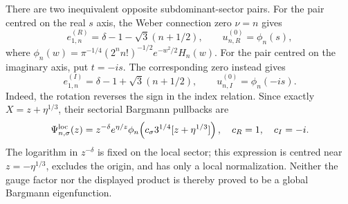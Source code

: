 \documentclass[11pt]{article}
\theoremstyle{remark}
\begin{document}
There are two inequivalent opposite subdominant-sector pairs.  For the pair
centred on the real \(s\) axis, the Weber connection zero \(\nu=n\) gives
\begin{equation}
 e_{1,n}^{(R)}=\delta-1-\sqrt3(n+1/2),\qquad
 u_{n,R}^{(0)}=\phi_n(s),
 \label{eq:fedoryuk-real-branch}
\end{equation}
where
\(\phi_n(w)=\pi^{-1/4}(2^n n!)^{-1/2}e^{-w^2/2}H_n(w)\).
For the pair centred on the imaginary axis, put \(t=-is\).  The corresponding
zero instead gives
\begin{equation}
 e_{1,n}^{(I)}=\delta-1+\sqrt3(n+1/2),\qquad
 u_{n,I}^{(0)}=\phi_n(-is).
 \label{eq:fedoryuk-imaginary-branch}
\end{equation}
Indeed, the rotation reverses the sign in the index relation.  Since exactly
\(X=z+\eta^{1/3}\), their sectorial Bargmann pullbacks are
\begin{equation}
 \Psi_{n,\sigma}^{\rm loc}(z)=z^{-\delta}e^{\eta/z}
 \phi_n\!\left(c_\sigma3^{1/4}[z+\eta^{1/3}]\right),
 \quad c_R=1,\quad c_I=-i.
 \label{eq:fedoryuk-local-pullback}
\end{equation}
The logarithm in \(z^{-\delta}\) is fixed on the local sector; this expression
is centred near \(z=-\eta^{1/3}\), excludes the origin, and has only a local
normalization.  Neither the gauge factor nor the displayed product is thereby
proved to be a global Bargmann eigenfunction.
\end{document}
